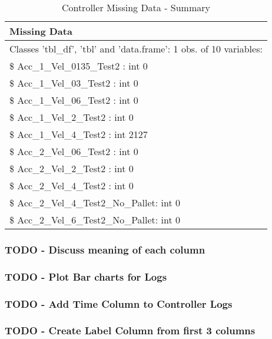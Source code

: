 \documentclass[]{article}
\begin{document}
\begin{table}[!h]

\caption{\label{tab:log_nas}Controller Missing Data - Summary}
\centering
\begin{tabular}[t]{l}
\hline
Missing Data\\
\hline
Classes 'tbl\_df', 'tbl' and 'data.frame':  1 obs. of  10 variables:\\
\hline
\$ Acc\_1\_Vel\_0135\_Test2       : int 0\\
\hline
\$ Acc\_1\_Vel\_03\_Test2         : int 0\\
\hline
\$ Acc\_1\_Vel\_06\_Test2         : int 0\\
\hline
\$ Acc\_1\_Vel\_2\_Test2          : int 0\\
\hline
\$ Acc\_1\_Vel\_4\_Test2          : int 2127\\
\hline
\$ Acc\_2\_Vel\_06\_Test2         : int 0\\
\hline
\$ Acc\_2\_Vel\_2\_Test2          : int 0\\
\hline
\$ Acc\_2\_Vel\_4\_Test2          : int 0\\
\hline
\$ Acc\_2\_Vel\_4\_Test2\_No\_Pallet: int 0\\
\hline
\$ Acc\_2\_Vel\_6\_Test2\_No\_Pallet: int 0\\
\hline
\end{tabular}
\end{table}

\newpage

\hypertarget{todo---discuss-meaning-of-each-column}{%
\subsubsection{TODO - Discuss meaning of each
column}\label{todo---discuss-meaning-of-each-column}}

\hypertarget{todo---plot-bar-charts-for-logs}{%
\subsubsection{TODO - Plot Bar charts for
Logs}\label{todo---plot-bar-charts-for-logs}}

\hypertarget{todo---add-time-column-to-controller-logs}{%
\subsubsection{TODO - Add Time Column to Controller
Logs}\label{todo---add-time-column-to-controller-logs}}

\hypertarget{todo---create-label-column-from-first-3-columns}{%
\subsubsection{TODO - Create Label Column from first 3
columns}\label{todo---create-label-column-from-first-3-columns}}
\end{document}

